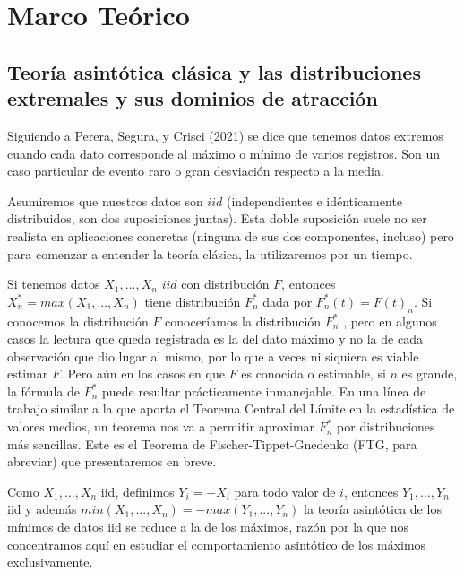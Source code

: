 \documentclass[
  12pt]{article}
\begin{document}
\hypertarget{marco-teuxf3rico}{%
\section{Marco Teórico}\label{marco-teuxf3rico}}

\hypertarget{teoruxeda-asintuxf3tica-cluxe1sica-y-las-distribuciones-extremales-y-sus-dominios-de-atracciuxf3n}{%
\subsection{Teoría asintótica clásica y las distribuciones extremales y
sus dominios de
atracción}\label{teoruxeda-asintuxf3tica-cluxe1sica-y-las-distribuciones-extremales-y-sus-dominios-de-atracciuxf3n}}

Siguiendo a Perera, Segura, y Crisci (2021) se dice que tenemos datos
extremos cuando cada dato corresponde al máximo o mínimo de varios
registros. Son un caso particular de evento raro o gran desviación
respecto a la media.

Asumiremos que nuestros datos son \(iid\) (independientes e
idénticamente distribuidos, son dos suposiciones juntas). Esta doble
suposición suele no ser realista en aplicaciones concretas (ninguna de
sus dos componentes, incluso) pero para comenzar a entender la teoría
clásica, la utilizaremos por un tiempo.

Si tenemos datos \(X_1,...,X_n\) \(iid\) con distribución \(F\),
entonces \(X_n^* = max (X_1,...,X_n)\) tiene distribución \(F_n^*\) dada
por \(F_n^* (t)= F(t)_n\). Si conocemos la distribución \(F\)
conoceríamos la distribución \(F_n^*\) , pero en algunos casos la
lectura que queda registrada es la del dato máximo y no la de cada
observación que dio lugar al mismo, por lo que a veces ni siquiera es
viable estimar \(F\). Pero aún en los casos en que \(F\) es conocida o
estimable, si \(n\) es grande, la fórmula de \(F_n^*\) puede resultar
prácticamente inmanejable. En una línea de trabajo similar a la que
aporta el Teorema Central del Límite en la estadística de valores
medios, un teorema nos va a permitir aproximar \(F_n^*\) por
distribuciones más sencillas. Este es el Teorema de
Fischer-Tippet-Gnedenko (FTG, para abreviar) que presentaremos en breve.

Como \(X_1,...,X_n\) iid, definimos \(Y_i = -X_i\) para todo valor de
\(i\), entonces \(Y_1,...,Y_n\) iid y además
\(min(X_1,...,X_n) = - max(Y_1,...,Y_n)\) la teoría asintótica de los
mínimos de datos iid se reduce a la de los máximos, razón por la que nos
concentramos aquí en estudiar el comportamiento asintótico de los
máximos exclusivamente.
\end{document}
